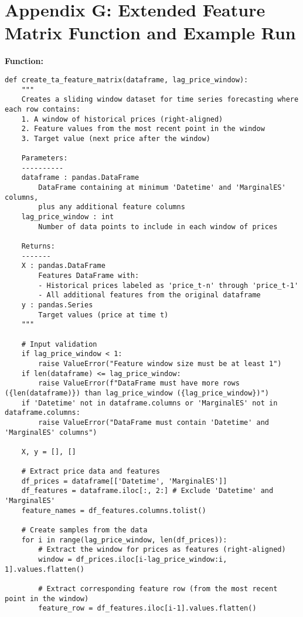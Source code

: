 \documentclass[12pt]{report} %
\begin{document}
\chapter* {Appendix G: Extended Feature Matrix Function and Example Run}
\label{app:appendix_g_extended_feature_matrix}

\noindent \textbf{Function:}
\begin{lstlisting}
def create_ta_feature_matrix(dataframe, lag_price_window):
    """
    Creates a sliding window dataset for time series forecasting where each row contains:
    1. A window of historical prices (right-aligned)
    2. Feature values from the most recent point in the window
    3. Target value (next price after the window)
    
    Parameters:
    ----------
    dataframe : pandas.DataFrame
        DataFrame containing at minimum 'Datetime' and 'MarginalES' columns, 
        plus any additional feature columns
    lag_price_window : int
        Number of data points to include in each window of prices
        
    Returns:
    -------
    X : pandas.DataFrame
        Features DataFrame with:
        - Historical prices labeled as 'price_t-n' through 'price_t-1'
        - All additional features from the original dataframe
    y : pandas.Series
        Target values (price at time t)
    """
    
    # Input validation
    if lag_price_window < 1:
        raise ValueError("Feature window size must be at least 1")
    if len(dataframe) <= lag_price_window:
        raise ValueError(f"DataFrame must have more rows ({len(dataframe)}) than lag_price_window ({lag_price_window})")
    if 'Datetime' not in dataframe.columns or 'MarginalES' not in dataframe.columns:
        raise ValueError("DataFrame must contain 'Datetime' and 'MarginalES' columns")

    X, y = [], []
    
    # Extract price data and features
    df_prices = dataframe[['Datetime', 'MarginalES']]
    df_features = dataframe.iloc[:, 2:] # Exclude 'Datetime' and 'MarginalES'
    feature_names = df_features.columns.tolist()

    # Create samples from the data
    for i in range(lag_price_window, len(df_prices)):
        # Extract the window for prices as features (right-aligned)
        window = df_prices.iloc[i-lag_price_window:i, 1].values.flatten()
        
        # Extract corresponding feature row (from the most recent point in the window)
        feature_row = df_features.iloc[i-1].values.flatten()


\end{lstlisting}
\end{document}
